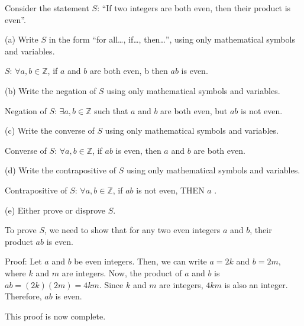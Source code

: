 \documentclass{article}
\begin{document}
Consider the statement $S$: ``If two integers are both even, then their product is even''.

(a) Write $S$ in the form ``for all\ldots, if\ldots, then\ldots'', using only mathematical symbols and variables.

$S$: $\forall a, b \in \mathbb{Z}$, if $a$ and $b$ are both even, b then $ab$ is even.

(b) Write the negation of $S$ using only mathematical symbols and variables.

Negation of $S$: $\exists a, b \in \mathbb{Z}$ such that $a$ and $b$ are both even, but $ab$ is not even.

(c) Write the converse of $S$ using only mathematical symbols and variables.

Converse of $S$: $\forall a, b \in \mathbb{Z}$, if $ab$ is even, then $a$ and $b$ are both even.

(d) Write the contrapositive of $S$ using only mathematical symbols and variables.

Contrapositive of $S$: $\forall a, b \in \mathbb{Z}$, if $ab$ is not even, THEN $a$ .

(e) Either prove or disprove $S$.

To prove $S$, we need to show that for any two even integers $a$ and $b$, their product $ab$ is even.

Proof: Let $a$ and $b$ be even integers. Then, we can write $a = 2k$ and $b = 2m$, where $k$ and $m$ are integers. Now, the product of $a$ and $b$ is $ab = (2k)(2m) = 4km$. Since $k$ and $m$ are integers, $4km$ is also an integer. Therefore, $ab$ is even.

This proof is now complete.
\end{document}
